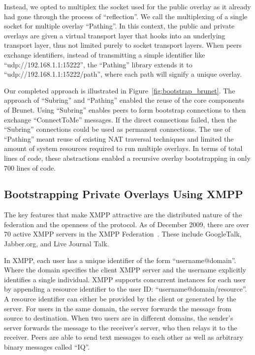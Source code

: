\documentclass[conference]{IEEEtran}
\begin{document}
Instead, we opted to multiplex the socket used for the public overlay as it
already had gone through the process of ``reflection''.  We call the
multiplexing of a single socket for multiple overlay ``Pathing''.  In this
context, the public and private overlays are given a virtual transport layer
that hooks into an underlying transport layer, thus not limited purely to
socket transport layers.  When peers exchange identifiers, instead of
transmitting a simple identifier like ``udp://192.168.1.1:15222'', the
``Pathing'' library extends it to ``udp://192.168.1.1:15222/path'', where each
path will signify a unique overlay.

Our completed approach is illustrated in Figure~\ref{fig:bootstrap_brunet}.
The approach of ``Subring'' and ``Pathing'' enabled the reuse of the core
components of Brunet.  Using ``Subring'' enables peers to form bootstrap
connections to then exchange ``ConnectToMe'' messages.  If the direct
connections failed, then the ``Subring'' connections could be used as permanent
connections.  The use of ``Pathing'' meant reuse of existing NAT traversal
techniques and limited the amount of system resources required to run multiple
overlays.  In terms of total lines of code, these abstractions enabled a
recursive overlay bootstrapping in only 700 lines of code.

\subsection{Bootstrapping Private Overlays Using XMPP}
\label{xmpp_bootstrapping}

The key features that make XMPP attractive are the distributed nature of the
federation and the openness of the protocol.  As of December 2009, there are
over 70 active XMPP servers in the XMPP Federation~\cite{xmpp_servers}.  These
include GoogleTalk, Jabber.org, and Live Journal Talk.

In XMPP, each user has a unique identifier of the form ``username@domain''.
Where the domain specifies the client XMPP server and the username explicitly
identifies a single individual.  XMPP supports concurrent instances for each
user by appending a resource identifier to the user ID:
``username@domain/resource''.  A resource identifier can either be provided by
the client or generated by the server.  For users in the same domain, the
server forwards the message from source to destination.  When two users are in
different domains, the sender's server forwards the message to the receiver's
server, who then relays it to the receiver.  Peers are able to send text
messages to each other as well as arbitrary binary messages called ``IQ''.
\end{document}
